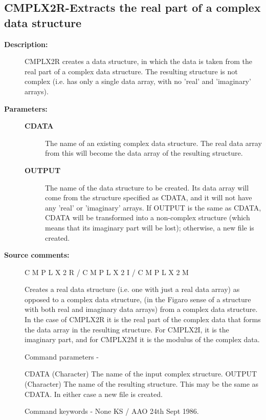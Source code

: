 \subsection{CMPLX2R-\label{CMPLX2R}Extracts the real part of a complex data structure}
\begin{description}

\item [\textbf{Description:}]
 CMPLX2R creates a data structure, in which the data is taken
 from the real part of a complex data structure.  The resulting
 structure is not complex (i.e. has only a single data array, with
 no 'real' and 'imaginary' arrays).

\item [\textbf{Parameters:}]
\begin{description}
\item [\textbf{CDATA}]
 The name of an existing complex data structure.
 The real data array from this will become the data array
 of the resulting structure.
\item [\textbf{OUTPUT}]
 The name of the data structure to be created.
 Its data array will come from the structure specified as
 CDATA, and it will not have any 'real' or 'imaginary'
 arrays.  If OUTPUT is the same as CDATA, CDATA will be
 transformed into a non-complex structure (which means
 that its imaginary part will be lost); otherwise, a new
 file is created.
\end{description}

\item [\textbf{Source comments:}]
\begin{terminalv}
 C M P L X 2 R    /     C M P L X 2 I   /   C M P L X 2 M

 Creates a real data structure (i.e. one with just a real data array)
 as opposed to a complex data structure, (in the Figaro sense of a
 structure with both  real and imaginary data arrays)
 from a complex data structure.
 In the case of CMPLX2R it is the real part of the complex data
 that forms the data array in the resulting structure.
 For CMPLX2I, it is the imaginary part, and for CMPLX2M
 it is the modulus of the complex data.

 Command parameters -

 CDATA    (Character) The name of the input complex structure.
 OUTPUT   (Character) The name of the resulting structure.  This
          may be the same as CDATA. In either case a new file
          is created.

 Command keywords - None
                                     KS / AAO  24th Sept 1986.
\end{terminalv}
\end{description}
